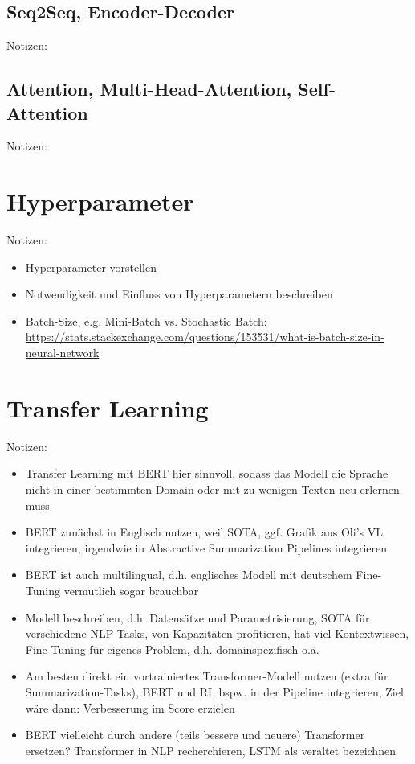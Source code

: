 \subsection{Seq2Seq, Encoder-Decoder}
Notizen:


\subsection{Attention, Multi-Head-Attention, Self-Attention}
Notizen:


\section{Hyperparameter}
Notizen:
\begin{itemize}
	\item Hyperparameter vorstellen
	\item Notwendigkeit und Einfluss von Hyperparametern beschreiben
	\item Batch-Size, e.g. Mini-Batch vs. Stochastic Batch: \url{https://stats.stackexchange.com/questions/153531/what-is-batch-size-in-neural-network}
\end{itemize}


\section{Transfer Learning}
Notizen:
\begin{itemize}
	\item Transfer Learning mit BERT hier sinnvoll, sodass das Modell die Sprache nicht in einer bestimmten Domain oder mit zu wenigen Texten neu erlernen muss
	\item BERT zunächst in Englisch nutzen, weil SOTA, ggf. Grafik aus Oli's VL integrieren, irgendwie in Abstractive Summarization Pipelines integrieren
	\item BERT ist auch multilingual, d.h. englisches Modell mit deutschem Fine-Tuning vermutlich sogar brauchbar
	\item Modell beschreiben, d.h. Datensätze und Parametrisierung, SOTA für verschiedene NLP-Tasks, von Kapazitäten profitieren, hat viel Kontextwissen, Fine-Tuning für eigenes Problem, d.h. domainspezifisch o.ä.
	\item Am besten direkt ein vortrainiertes Transformer-Modell nutzen (extra für Summarization-Tasks), BERT und RL bspw. in der Pipeline integrieren, Ziel wäre dann: Verbesserung im Score erzielen
	\item BERT vielleicht durch andere (teils bessere und neuere) Transformer ersetzen? Transformer in NLP recherchieren, LSTM als veraltet bezeichnen
\end{itemize}
